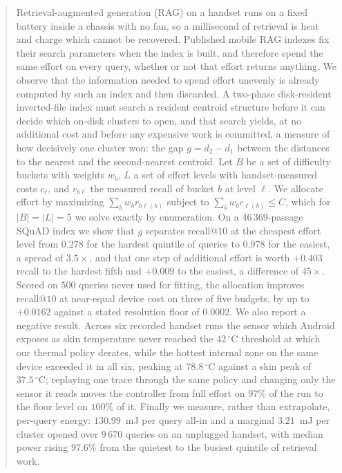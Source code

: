 \documentclass[journal]{IEEEtran}
\newcommand{\degC}{\,^{\circ}\mathrm{C}}
\begin{document}
\begin{abstract}
Retrieval-augmented generation (RAG) on a handset runs on a fixed battery
inside a chassis with no fan, so a millisecond of retrieval is heat and
charge which cannot be recovered. Published mobile RAG indexes fix their
search parameters when the index is built, and therefore spend the same
effort on every query, whether or not that effort returns anything. We
observe that the information needed to spend effort unevenly is already
computed by such an index and then discarded. A two-phase disk-resident
inverted-file index must search a resident centroid structure before it
can decide which on-disk clusters to open, and that search yields, at no
additional cost and before any expensive work is committed, a measure of
how decisively one cluster won: the gap $g = d_2 - d_1$ between the
distances to the nearest and the second-nearest centroid. Let $B$ be a
set of difficulty buckets with weights $w_b$, $L$ a set of effort levels
with handset-measured costs $c_\ell$, and $r_{b\ell}$ the measured recall
of bucket $b$ at level $\ell$. We allocate effort by maximizing
$\sum_b w_b r_{b\ell(b)}$ subject to $\sum_b w_b c_{\ell(b)} \le C$,
which for $|B| = |L| = 5$ we solve exactly by enumeration. On a
$46\,369$-passage SQuAD index we show that $g$ separates recall@$10$ at
the cheapest effort level from $0.278$ for the hardest quintile of queries
to $0.978$ for the easiest, a spread of $3.5\times$, and that one step of
additional effort is worth $+0.403$ recall to the hardest fifth and
$+0.009$ to the easiest, a difference of $45\times$. Scored on $500$
queries never used for fitting, the allocation improves recall@$10$ at
near-equal device cost on three of five budgets, by up to $+0.0162$
against a stated resolution floor of $0.0002$. We also report a negative
result. Across six recorded handset runs the sensor which Android exposes
as skin temperature never reached the $42\degC$ threshold at which our
thermal policy derates, while the hottest internal zone on the same device
exceeded it in all six, peaking at $78.8\degC$ against a skin peak of
$37.5\degC$; replaying one trace through the same policy and changing only
the sensor it reads moves the controller from full effort on $97\%$ of the
run to the floor level on $100\%$ of it. Finally we measure, rather than
extrapolate, per-query energy: $130.99$~mJ per query all-in and a marginal
$3.21$~mJ per cluster opened over $9\,670$ queries on an unplugged handset,
with median power rising $97.6\%$ from the quietest to the busiest quintile
of retrieval work.
\end{abstract}
\end{document}
